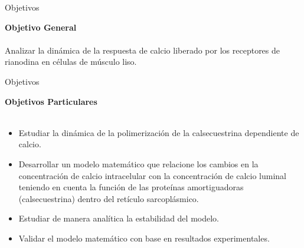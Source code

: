 \begin{frame}{Objetivos}
	
	\textbf{Objetivo General} \\ ~ \\
	
	Analizar la dinámica de la respuesta de calcio liberado por los receptores de rianodina en células de músculo liso.

\end{frame}


\begin{frame}{Objetivos}
	
	\textbf{Objetivos Particulares} \\ ~ \\

	\begin{itemize}
		\item Estudiar la dinámica de la polimerización de la calsecuestrina dependiente de calcio. \\
		
		\item Desarrollar un modelo matemático que relacione los cambios en la concentración de calcio intracelular con la concentración de calcio luminal teniendo en cuenta la función de las proteínas amortiguadoras (calsecuestrina) dentro del retículo sarcoplásmico. \\
		
		\item Estudiar de manera analítica la estabilidad del modelo. \\
		
		\item Validar el modelo matemático con base en resultados experimentales.
	\end{itemize}
	
\end{frame}